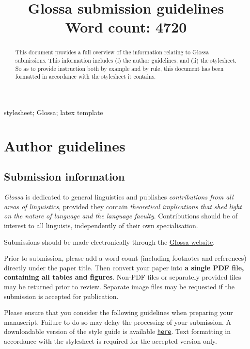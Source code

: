 \documentclass[charis,linguex]{glossa}
\title[Glossa guidelines]{Glossa submission guidelines\\ \bigskip \large Word count: 4720}
\author[Paul \& Vanden Wyngaerd]%
{%
  \spauthor{Waltraud Paul\\
  \institute{CRLAO, CNRS-EHESS-INALCO}\\
  \small{%
  waltraud.paul@ehess.fr}
  }
  \AND
  \spauthor{Guido Vanden Wyngaerd \\
  \institute{KU Leuven}\\
  \small{%
  guido.vandenwyngaerd@kuleuven.be}
  }%
}
\begin{document}
\maketitle


\begin{abstract}
This document provides a full overview of the information relating to Glossa submissions. This information includes (i) the author guidelines, and (ii) the stylesheet. So as to provide instruction both by example and by rule, this document has been formatted in accordance with the stylesheet it contains.
\end{abstract}

\begin{keywords}
  stylesheet; Glossa; latex template
\end{keywords}


\section{Author guidelines}
\subsection{Submission information}

\emph{Glossa} is dedicated to general linguistics and publishes \emph{contributions from all areas of linguistics}, provided they contain \emph{theoretical implications that shed light on the nature of language and the language faculty}. Contributions should be of interest to all linguists, independently of their own specialisation.

Submissions should be made electronically through the \href{https://www.glossa-journal.org}{Glossa website}.

Prior to submission, please add a word count (including footnotes and references) directly under the paper title. Then convert your paper into \textbf{a single PDF file, containing all tables and figures}. Non-PDF files or separately provided files may be returned prior to review. Separate image files may be requested if the submission is accepted for publication.

Please ensure that you consider the following guidelines when preparing your manuscript. Failure to do so may delay the processing of your submission. A downloadable version of the style guide is available \href{https://github.com/guidovw/Glossalatex/blob/master/glossa-template.pdf}{\texttt{here}}. Text formatting in accordance with  the stylesheet is required for the accepted version only.
\end{document}

